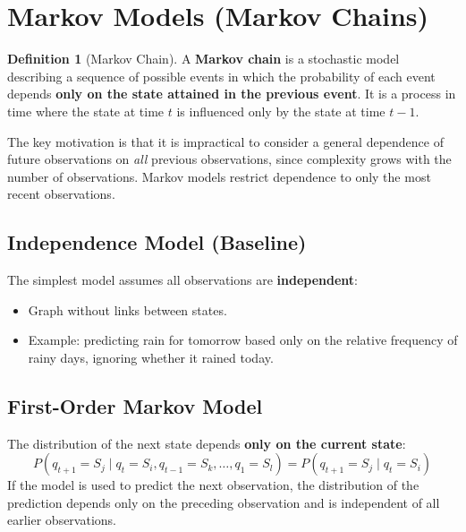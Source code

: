 \documentclass[11pt,a4paper]{article}
\theoremstyle{definition}
\newtheorem{definition}{Definition}[section]
\theoremstyle{plain}
\theoremstyle{remark}
\begin{document}
\section{Markov Models (Markov Chains)}

\begin{definition}[Markov Chain]
A \textbf{Markov chain} is a stochastic model describing a sequence of possible events in which the probability of each event depends \textbf{only on the state attained in the previous event}. It is a process in time where the state at time $t$ is influenced only by the state at time $t-1$.
\end{definition}

The key motivation is that it is impractical to consider a general dependence of future observations on \emph{all} previous observations, since complexity grows with the number of observations. Markov models restrict dependence to only the most recent observations.

\subsection{Independence Model (Baseline)}

The simplest model assumes all observations are \textbf{independent}:
\begin{itemize}
    \item Graph without links between states.
    \item Example: predicting rain for tomorrow based only on the relative frequency of rainy days, ignoring whether it rained today.
\end{itemize}

\subsection{First-Order Markov Model}

\begin{tcolorbox}[colback=green!5!white,colframe=green!75!black,title=\textbf{First-Order Markov Property}]
The distribution of the next state depends \textbf{only on the current state}:
\[
P(q_{t+1} = S_j \mid q_t = S_i, q_{t-1} = S_k, \dots, q_1 = S_l) = P(q_{t+1} = S_j \mid q_t = S_i)
\]
If the model is used to predict the next observation, the distribution of the prediction depends only on the preceding observation and is independent of all earlier observations.
\end{tcolorbox}
\end{document}
